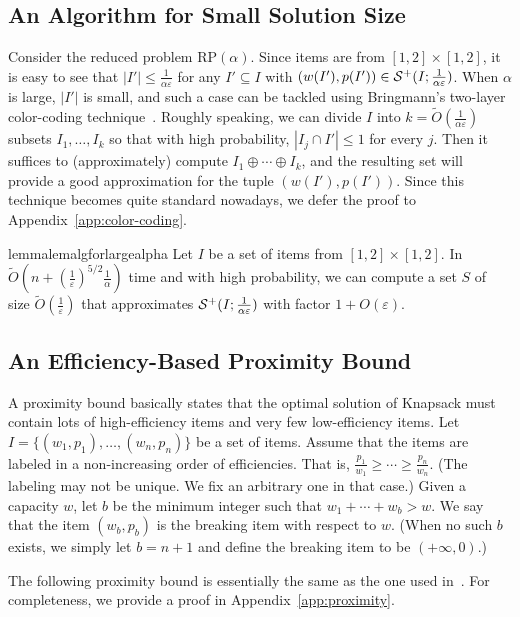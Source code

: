 \documentclass[a4paper,UKenglish,cleveref, autoref, thm-restate, pdfa]{lipics-v2021}
\newcommand{\eps}{\varepsilon}
\renewcommand{\leq}{\leqslant}
\renewcommand{\geq}{\geqslant}
\begin{document}
\subsection{An Algorithm for Small Solution Size}
Consider the reduced problem $\mathrm{RP}(\alpha)$. Since items are from $[1,2] \times [1,2]$, it is easy to see that $|I'| \leq \frac{1}{\alpha\eps}$ for any $I' \subseteq I$ with $(w(I'), p(I')) \in {\cal S}^+(I; \frac{1}{\alpha\eps})$. When $\alpha$ is large, $|I'|$ is small, and such a case can be tackled using Bringmann's two-layer color-coding technique~\cite{Bri17}. Roughly speaking, we can divide $I$ into $k = \tilde{O}(\frac{1}{\alpha\eps})$ subsets $I_1, \ldots, I_k$ so that with high probability, $|I_j \cap I'| \leq 1$ for every $j$. Then it suffices to (approximately) compute $I_1 \oplus \cdots \oplus I_k$, and the resulting set will provide a good approximation for the tuple $(w(I'), p(I'))$.  Since this technique becomes quite standard nowadays, we defer the proof to Appendix~\ref{app:color-coding}.

\begin{restatable}{lemma}{lemalgforlargealpha}\label{lem:alg-for-large-alpha}
    Let $I$ be a set of items from $[1, 2]\times [1,2]$.  In $\tilde{O}(n + (\frac{1}{\eps})^{5/2}\frac{1}{\alpha})$ time and with high probability, we can compute a set $S$ of size $\tilde{O}(\frac{1}{\eps})$ that approximates ${\cal S}^+(I; \frac{1}{\alpha\eps})$ with factor $1 + O(\eps)$.
\end{restatable}

\subsection{An Efficiency-Based Proximity Bound}
A proximity bound basically states that the optimal solution of Knapsack must contain lots of high-efficiency items and very few low-efficiency items. Let $I = \{(w_1, p_1), \ldots, (w_n, p_n)\}$ be a set of items. Assume that the items are labeled in a non-increasing order of efficiencies. That is, $\frac{p_1}{w_1} \geq \cdots \geq \frac{p_n}{w_n}$. (The labeling may not be unique. We fix an arbitrary one in that case.) Given a capacity $w$, let $b$ be the minimum integer such that $w_1 + \cdots + w_b > w$. We say that the item $(w_b, p_b)$ is the breaking item with respect to $w$. (When no such $b$ exists, we simply let $b = n+1$ and define the breaking item to be $(+\infty, 0)$.) 

The following proximity bound is essentially the same as the one used in~\cite{Jin19,DJM23}. For completeness, we provide a proof in Appendix~\ref{app:proximity}.
\end{document}
